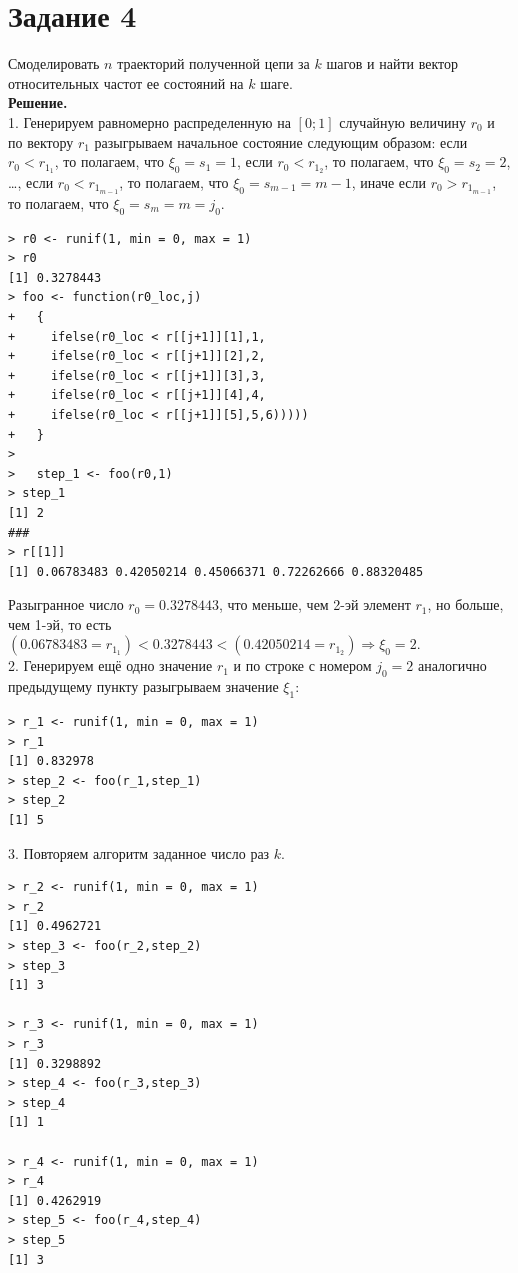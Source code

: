 \documentclass[14pt,a4paper]{scrartcl}
\begin{document}
\section*{Задание 4}
Смоделировать $n$ траекторий полученной цепи за $k$ шагов и найти вектор относительных частот ее состояний на $k$ шаге.\\
\textbf{Решение.}\\

1. Генерируем равномерно распределенную на $[0;1]$ случайную величину $r_0$ и по вектору $r_1$ разыгрываем начальное состояние следующим образом: если $r_0 < r_{1_1}$, то полагаем, что $\xi_0 = s_1 = 1$, если $r_0 < r_{1_2}$, то полагаем, что $\xi_0 = s_2 = 2$, \ldots, если $r_0 < r_{1_{m-1}}$, то полагаем, что $\xi_0 = s_{m-1} = m-1$, иначе если $r_0 > r_{1_{m-1}}$, то полагаем, что $\xi_0 = s_{m} = m = j_0$.


\begin{verbatim}
> r0 <- runif(1, min = 0, max = 1)
> r0
[1] 0.3278443
> foo <- function(r0_loc,j)
+   {
+     ifelse(r0_loc < r[[j+1]][1],1,
+     ifelse(r0_loc < r[[j+1]][2],2,
+     ifelse(r0_loc < r[[j+1]][3],3,
+     ifelse(r0_loc < r[[j+1]][4],4,
+     ifelse(r0_loc < r[[j+1]][5],5,6)))))
+   }
>   
>   step_1 <- foo(r0,1)
> step_1
[1] 2
###
> r[[1]]
[1] 0.06783483 0.42050214 0.45066371 0.72262666 0.88320485
\end{verbatim}

Разыгранное число $r_0 = 0.3278443$, что меньше, чем 2-эй элемент $r_1$, но больше, чем 1-эй, то есть $(0.06783483 = r_{1_1}) < 0.3278443 < (0.42050214 = r_{1_2})  \Rightarrow \xi_0 = 2$. \\

2. Генерируем ещё одно значение $r_1$ и по строке с номером $j_0 = 2$ аналогично предыдущему пункту разыгрываем значение $\xi_1:$

\begin{verbatim}
> r_1 <- runif(1, min = 0, max = 1)
> r_1
[1] 0.832978
> step_2 <- foo(r_1,step_1)
> step_2
[1] 5
\end{verbatim}

3. Повторяем алгоритм  заданное число раз $k$.

\begin{verbatim}
> r_2 <- runif(1, min = 0, max = 1)
> r_2
[1] 0.4962721
> step_3 <- foo(r_2,step_2)
> step_3
[1] 3

> r_3 <- runif(1, min = 0, max = 1)
> r_3
[1] 0.3298892
> step_4 <- foo(r_3,step_3)
> step_4
[1] 1

> r_4 <- runif(1, min = 0, max = 1)
> r_4
[1] 0.4262919
> step_5 <- foo(r_4,step_4)
> step_5
[1] 3
\end{verbatim}
\end{document}
